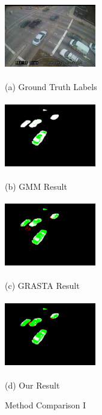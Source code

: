 \documentclass{article}
\begin{document}
\begin{figure}[t]
\centering
\begin{minipage}[b]{0.48\linewidth}
  \centering
  \centerline{\includegraphics[width=4cm, height=3cm]{Imgs/0112051333.jpg}}
  \centerline{(a) Ground Truth Labels}\medskip
\end{minipage}
\begin{minipage}[b]{0.48\linewidth}
  \centering
  \centerline{\includegraphics[width=4cm, height=3cm]{Imgs/0112051333_gmm_rwg.png}}
  \centerline{(b) GMM Result}\medskip
\end{minipage}

\begin{minipage}[b]{0.48\linewidth}
  \centering
  \centerline{\includegraphics[width=4cm, height =3cm]{Imgs/0112051333_grasta_rwg.png}}
  \centerline{(c) GRASTA Result}\medskip
\end{minipage}
\begin{minipage}[b]{0.48\linewidth}
  \centering
  \centerline{\includegraphics[width=4cm, height = 3cm]{Imgs/0112051333_rpca_rwg.png}}
  \centerline{(d) Our Result}\medskip
\end{minipage}

\caption{Method Comparison I}
\label{fig:methodComp1}
%
\end{figure}
\end{document}
